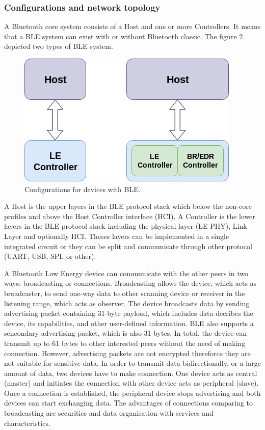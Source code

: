 \subsubsection{Configurations and network topology}
A Bluetooth core system consists of a Host and one or more Controllers. It means that
a BLE system can exist with or without Bluetooth classic. The figure 2 depicted two 
types of BLE system.
\begin{figure}[H]
    \centering
    \includegraphics[scale=0.6]{figure/figure02_ble_configurations.png}
    \caption{Configurations for devices with BLE.}
\end{figure}
\justify
A Host is the upper layers in the BLE protocol stack which below the non-core profiles
and above the Host Controller interface (HCI). A Controller is the lower layers in the 
BLE protocol stack including the physical layer (LE PHY), Link Layer and optionally HCI. 
Theses layers can be implemented in a single integrated circuit or they can be split 
and communicate through other protocol (UART, USB, SPI, or other).

\justify
A Bluetooth Low Energy device can communicate with the other peers in two ways: 
broadcasting or connections.
Broadcasting allows the device, which acts as broadcaster, to send one-way data to 
other scanning device or receiver in the listening range, which acts as observer. 
The device broadcasts data by sending advertising packet containing 31-byte payload,
which includes data decribes the device, its capabilities, and other user-defined 
information. BLE also supports a sencondary advertising packet, which is also 31 bytes.
In total, the device can transmit up to 61 bytes to other interested peers without the
need of making connection. However, advertising packets are not encrypted thereforce 
they are not suitable for sensitive data.
In order to transmit data bidirectionally, or a large amount of data, two devices have
to make connection. One device acts as central (master) and initiates the connection
with other device acts as peripheral (slave). Once a connection is established, the
peripheral device stops advertising and both devices can start exchanging data.
The advantages of connections comparing to broadcasting are securities and data 
organisation with services and characteristics.

